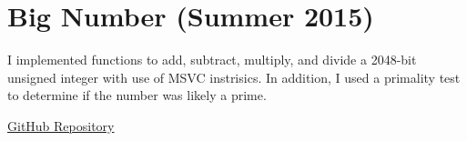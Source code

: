 

\section{Big Number (Summer 2015)}

I implemented functions to add, subtract, multiply, and divide a
2048-bit unsigned integer with use of MSVC instrisics.
In addition, I used a primality test to determine if the number was likely a prime.

\href{https://github.com/MichaelMitchellM/BigNumber}{GitHub Repository}